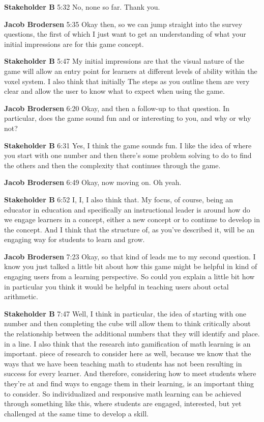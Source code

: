 \documentclass{article}
\begin{document}
\noindent \textbf{Stakeholder B}   5:32
No, none so far. Thank you.

\noindent \textbf{Jacob Brodersen}   5:35
Okay then, so we can jump straight into the survey questions, the first of which I just want to get an understanding of what your initial impressions are for this game concept.

\noindent \textbf{Stakeholder B}   5:47
My initial impressions are that the visual nature of the game will allow an entry point for learners at different levels of ability within the voxel system. I also think that initially
The steps as you outline them are very clear and allow the user to know what to expect when using the game.

\noindent \textbf{Jacob Brodersen}   6:20
Okay, and then a follow-up to that question. In particular, does the game sound fun and or interesting to you, and why or why not?

\noindent \textbf{Stakeholder B}   6:31
Yes, I think the game sounds fun. I like the idea of where you start with one number and then there's some problem solving to do to find the others and then the complexity that continues through the game.

\noindent \textbf{Jacob Brodersen}   6:49
Okay, now moving on. Oh yeah.

\noindent \textbf{Stakeholder B}   6:52
I, I, I also think that.
My focus, of course, being an educator in education and specifically an instructional leader is around how do we engage learners in a concept, either a new concept or to continue to develop in the concept. And I think that the structure of, as you've described it,
will be an engaging way for students to learn and grow.

\noindent \textbf{Jacob Brodersen}   7:23
Okay, so that kind of leads me to my second question. I know you just talked a little bit about how this game might be helpful in kind of engaging users from a learning perspective. So could you explain a little bit how in particular you think it would be helpful in teaching users about
octal arithmetic.

\noindent \textbf{Stakeholder B}   7:47
Well, I think in particular, the idea of starting with one number and then completing the cube will allow them to think critically about the relationship between the additional numbers that they will identify and place.
in a line. I also think that the research into gamification of math learning is an important.
piece of research to consider here as well, because we know that the ways that we have been teaching math to students has not been resulting in success for every learner. And therefore, considering how to meet students where they're at and find ways to engage them in their learning,
is an important thing to consider. So individualized and responsive math learning can be achieved through something like this, where students are engaged, interested, but yet challenged at the same time to develop a skill.
\end{document}
